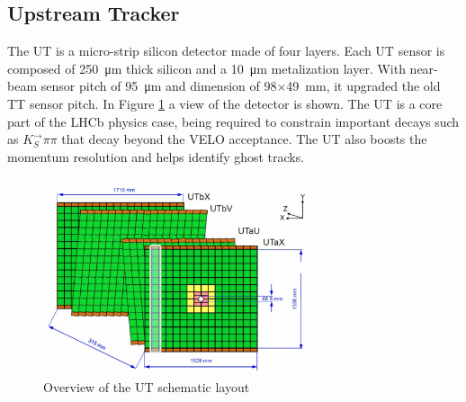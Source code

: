 \subsection{Upstream Tracker}
The UT is a micro-strip silicon detector made of four layers\cite{LHCb:2014uqj}. Each UT sensor is composed of \SI{250}{\micro\meter} thick silicon and a \SI{10}{\micro\meter} metalization layer. With near-beam sensor pitch of \SI{95}{\micro\meter} and dimension of $98$×\SI{49}{\milli\meter}, it upgraded the old TT sensor pitch. In Figure \ref{fig:UT} a view of the detector is shown\cite{ut}. 
The UT is a core part of the LHCb physics case, being required to constrain important decays such as $K_S^\rightarrow\pi\pi$ that decay beyond the VELO acceptance. The UT also boosts the momentum resolution and helps identify ghost tracks.

\begin{figure}
    \centering
    \includegraphics[width=0.7\textwidth]{figures/UT.png}
    \caption{Overview of the UT schematic layout}
    \label{fig:UT}
\end{figure}

